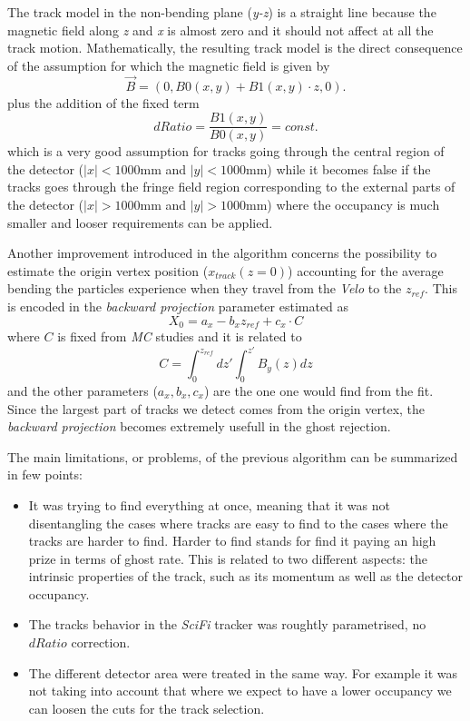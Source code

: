 \documentclass[paper=a4, fontsize=10pt]{scrartcl}
\numberwithin{equation}{section}		%
\numberwithin{figure}{section}			%
\numberwithin{table}{section}				%
\begin{document}
The track model in the non-bending plane (\textit{y-z}) is a straight line because the magnetic field along \textit{z} and \textit{x} is almost zero and it should not affect at all the track motion. Mathematically, the resulting track model is the direct consequence of the assumption for which the magnetic field is given by $$\overrightarrow{B} = (0,B0(x,y)+B1(x,y) \cdot z,0).$$ plus the addition of the fixed term $$dRatio = \frac{B1(x,y)}{B0(x,y)}=const.$$ which is a very good assumption for tracks going through the central region of the detector ($|x|<1000$mm and $|y|<1000$mm) while it becomes false if the tracks goes through the fringe field region corresponding to the external parts of the detector ($|x|>1000$mm and $|y|>1000$mm) where the occupancy is much smaller and looser requirements can be applied.

Another improvement introduced in the algorithm concerns the possibility to estimate the origin vertex position ($x_{track}(z=0)$) accounting for the average bending the particles experience when they travel from the \textit{Velo} to the $z_{ref}$.
This is encoded in the \textit{backward projection} parameter estimated as $$X_{0}=a_{x}-b_x z_{ref} + c_{x}\cdot C$$ where $C$ is fixed from \textit{MC} studies and it is related to $$C = \int _{ 0 }^{ { z }_{ ref } }{ dz' } \int _{ 0 }^{ z' }{ { B }_{ y }(z) } dz$$ and the other parameters ($a_x ,b_x ,c_x $) are the one one would find from the fit.
Since the largest part of tracks we detect comes from the origin vertex, the \textit{backward projection} becomes extremely usefull in the ghost rejection.

The main limitations, or problems, of the previous algorithm can be summarized in few points:
\begin{itemize} 
\item{It was trying to find everything at once, meaning that it was not disentangling the cases where tracks are easy to find to the cases where the tracks are harder to find. Harder to find stands for find it paying an high prize in terms of ghost rate. This is related to two different aspects: the intrinsic properties of the track, such as its momentum as well as the detector occupancy.}
\item{The tracks behavior in the \textit{SciFi} tracker was roughtly parametrised, no $dRatio$ correction.} 
\item{The different detector area were treated in the same way. For example it was not taking into account that where we expect to have a lower occupancy we can loosen the cuts for the track selection.}
\end{itemize}
\end{document}
